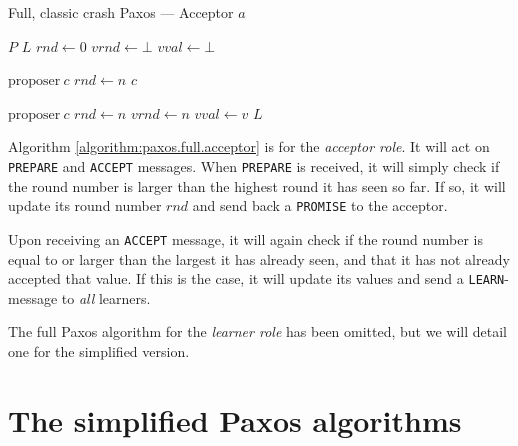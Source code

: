 \begin{algorithm}[H]
  \caption{Full, classic crash Paxos --- Acceptor $a$}
  \label{algorithm:paxos.full.acceptor}
  \begin{algorithmic}
    \State $P$ 
    \State $L$ 
    \State $rnd \gets 0$ 
    \State $vrnd \gets \bot$ 
    \State $vval \gets \bot$ 
    \State

       {$\text{proposer}\ c$} 
         \State $rnd \gets n$
         \State {}
                       {$c$}
      \EndIf
    \EndOn
    \State

       {$\text{proposer}\ c$} 
        \State $rnd \gets n$
        \State $vrnd \gets n$
        \State $vval \gets v$
        \State {}
                      {$L$}
      \EndIf
    \EndOn
  \end{algorithmic}
\end{algorithm}

Algorithm \ref{algorithm:paxos.full.acceptor}
 is for the \textit{acceptor
role}.  It will act on \texttt{PREPARE} and \texttt{ACCEPT} messages.
When \texttt{PREPARE} is received, it will simply check if the round number
is larger than the highest round it has seen so far.  If so, it will update
its round number $rnd$ and send back a \texttt{PROMISE} to the acceptor.

Upon receiving an \texttt{ACCEPT} message, it will again check if the round
number is equal to or larger than the largest it has already seen, and that
it has not already accepted that value.  If this is the case, it will update
its values and send a \texttt{LEARN}-message to \textit{all} learners.

The full Paxos algorithm for the \textit{learner role} has been omitted, but
we will detail one for the simplified version.

\clearpage
\section{The simplified Paxos algorithms}
\label{ch:simplifying.paxos}

